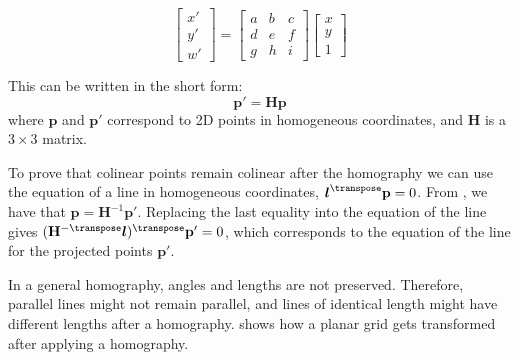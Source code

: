 \begin{equation}
    \begin{bmatrix}
        x' \\
        y' \\
        w'
    \end{bmatrix}
    =
    \begin{bmatrix}
        a & b & c \\
        d & e & f \\
        g & h & i
    \end{bmatrix}
    \begin{bmatrix}
        x \\
        y \\
        1
    \end{bmatrix}
    \label{eq:homography}
\end{equation}

This can be written in the short form:
\begin{equation}
    \mathbf{p}' = \mathbf{H} \mathbf{p}
    \label{eq:homography_generic}
\end{equation}
where $\mathbf{p}$ and $\mathbf{p}'$ correspond to 2D points in homogeneous coordinates, and $\mathbf{H}$ is a $3 \times 3$ matrix.

To prove that colinear points remain colinear after the homography we can use the equation of a line in homogeneous coordinates, $\boldsymbol{l}^\transpose \mathbf{p}=0$. From \eqn{\ref{eq:homography_generic}}, we have that $\mathbf{p} = \mathbf{H}^{-1} \mathbf{p}'$. Replacing the last equality into the equation of the line gives $(\mathbf{H} ^{-\transpose}\boldsymbol{l})^\transpose  \mathbf{p'}=0$, which corresponds to the equation of the line for the projected points $\mathbf{p}'$.



In a general homography, angles and lengths are not preserved. Therefore, parallel lines might not remain parallel, and lines of identical length might have different lengths after a homography.  \Fig{\ref{fig:illustration_homography2}} shows how a planar grid gets transformed after applying a homography.

